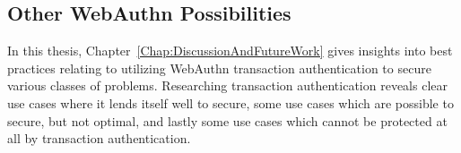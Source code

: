 
\subsection{Other WebAuthn Possibilities}

In this thesis, Chapter~\ref{Chap:DiscussionAndFutureWork} gives insights into best practices relating to utilizing WebAuthn transaction authentication to secure various classes of problems. Researching transaction authentication reveals clear use cases where it lends itself well to secure, some use cases which are possible to secure, but not optimal, and lastly some use cases which cannot be protected at all by transaction authentication. 




